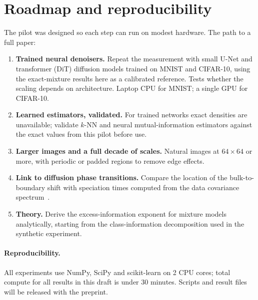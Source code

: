 \documentclass[10pt,twocolumn,a4paper]{article}
\begin{document}
\section{Roadmap and reproducibility}
The pilot was designed so each step can run on modest hardware. The path to a full paper:
\begin{enumerate}
\item \textbf{Trained neural denoisers.} Repeat the measurement with small U-Net and transformer (DiT) diffusion models trained on MNIST and CIFAR-10, using the exact-mixture results here as a calibrated reference. Tests whether the scaling depends on architecture. Laptop CPU for MNIST; a single GPU for CIFAR-10.
\item \textbf{Learned estimators, validated.} For trained networks exact densities are unavailable; validate $k$-NN and neural mutual-information estimators against the exact values from this pilot before use.
\item \textbf{Larger images and a full decade of scales.} Natural images at $64\times64$ or more, with periodic or padded regions to remove edge effects.
\item \textbf{Link to diffusion phase transitions.} Compare the location of the bulk-to-boundary shift with speciation times computed from the data covariance spectrum~\cite{biroli}.
\item \textbf{Theory.} Derive the excess-information exponent for mixture models analytically, starting from the class-information decomposition used in the synthetic experiment.
\end{enumerate}

\paragraph{Reproducibility.} All experiments use NumPy, SciPy and scikit-learn on 2 CPU cores; total compute for all results in this draft is under 30 minutes. Scripts and result files will be released with the preprint.
\end{document}
